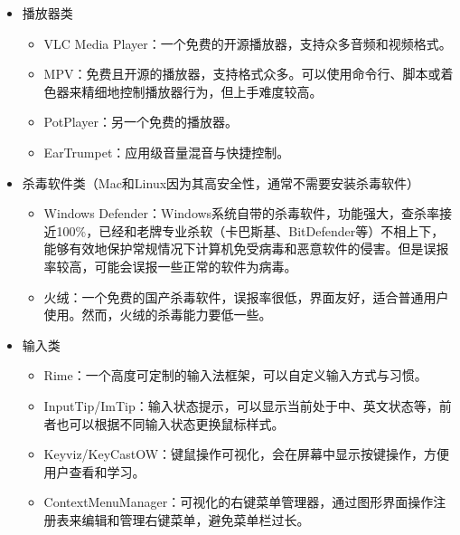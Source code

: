 \begin{itemize}
\begin{itemize}
    \end{itemize}
  \item 播放器类
    \begin{itemize}
      \item VLC Media Player：一个免费的开源播放器，支持众多音频和视频格式。
      \item MPV：免费且开源的播放器，支持格式众多。可以使用命令行、脚本或着色器来精细地控制播放器行为，但上手难度较高。
      \item PotPlayer：另一个免费的播放器。
      \item EarTrumpet：应用级音量混音与快捷控制。
    \end{itemize}
  \item 杀毒软件类（Mac和Linux因为其高安全性，通常不需要安装杀毒软件）
    \begin{itemize}
      \item Windows Defender：Windows系统自带的杀毒软件，功能强大，查杀率接近100\%，已经和老牌专业杀软（卡巴斯基、BitDefender等）不相上下，能够有效地保护常规情况下计算机免受病毒和恶意软件的侵害。但是误报率较高，可能会误报一些正常的软件为病毒。
      \item 火绒：一个免费的国产杀毒软件，误报率很低，界面友好，适合普通用户使用。然而，火绒的杀毒能力要低一些。
    \end{itemize}
  \item 输入类
    \begin{itemize}
      \item Rime：一个高度可定制的输入法框架，可以自定义输入方式与习惯。
      \item InputTip/ImTip：输入状态提示，可以显示当前处于中、英文状态等，前者也可以根据不同输入状态更换鼠标样式。
      \item Keyviz/KeyCastOW：键鼠操作可视化，会在屏幕中显示按键操作，方便用户查看和学习。
      \item ContextMenuManager：可视化的右键菜单管理器，通过图形界面操作注册表来编辑和管理右键菜单，避免菜单栏过长。


\end{itemize}
\end{itemize}
